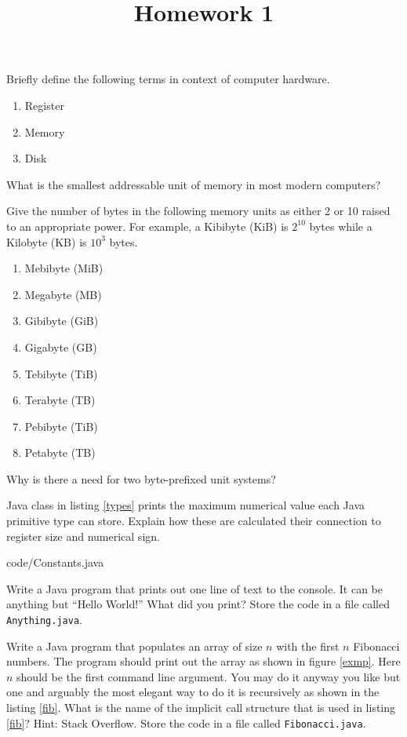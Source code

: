 \documentclass{homework}
\title{Homework 1}
\newcommand\callit[1]{Store the code in a file called \texttt{#1}.}
\begin{document}
 \maketitle

\question Briefly define the following terms in context of computer
hardware.

\begin{enumerate}
  \item Register
  \item Memory
  \item Disk
\end{enumerate}

\question What is the smallest addressable unit of memory in most modern
computers?

\question Give the number of bytes in the following memory units as either 2
or 10 raised to an appropriate power. For example, a Kibibyte
(KiB) is $2^{10}$ bytes while a Kilobyte (KB) is $10^3$ bytes.

\begin{enumerate}
  \item Mebibyte (MiB)
  \item Megabyte (MB)
  \item Gibibyte (GiB)
  \item Gigabyte (GB)
  \item Tebibyte (TiB)
  \item Terabyte (TB)
  \item Pebibyte (TiB)
  \item Petabyte (TB)
\end{enumerate}

Why is there a need for two byte-prefixed unit systems?

\question Java class in listing \ref{types} prints the maximum numerical
value each Java primitive type can store. Explain how these are
calculated \ie their connection to register size and numerical
sign.


{code/Constants.java}

\question Write a Java program that prints out one line of text to the
console. It can be anything but ``Hello World!'' What did you
print? \callit{Anything.java}

\question Write a Java program that populates an array of size $n$ with the
first $n$ Fibonacci numbers. The program should print out the
array as shown in figure \ref{exmp}. Here $n$ should be the first
command line argument. You may do it anyway you like but one and
arguably the most elegant way to do it is recursively as shown in
the listing \ref{fib}. What is the name of the implicit call
structure that is used in listing \ref{fib}? Hint: Stack Overflow.
\callit{Fibonacci.java}
\end{document}
